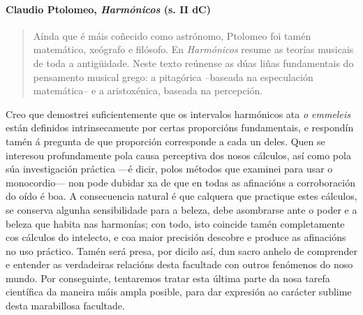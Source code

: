 

\paragraph{\texorpdfstring{Claudio Ptolomeo, \emph{Harmónicos} (s. II
dC)}{Claudio Ptolomeo, Harmónicos (s. II dC)}}\label{claudio-ptolomeo--harmuxf3nicos--s.-ii-dc}

\begin{quote}
Aínda que é máis coñecido como astrónomo, Ptolomeo foi tamén matemático, xeógrafo e filósofo. En \emph{Harmónicos} resume as teorías musicais de toda a antigüidade. Neste texto reúnense as dúas liñas fundamentais do pensamento musical grego: a pitagórica --baseada na especulación matemática-- e a aristoxénica, baseada na percepción.
\end{quote}

\begin{multicols}{3}
\setlength{\columnseprule}{1pt}
{\small
\noindent
Creo que demostrei suficientemente que os intervalos harmónicos ata \emph{o emmeleis} están definidos intrinsecamente por certas proporcións fundamentais, e respondín tamén á pregunta de que proporción corresponde a cada un deles. Quen se interesou profundamente pola causa perceptiva dos nosos cálculos, así como pola súa investigación práctica ---é dicir,
polos métodos que examinei para usar o monocordio--- non pode dubidar xa de que en todas as afinacións a corroboración do oído é boa. A consecuencia natural é que calquera que practique estes cálculos, se conserva algunha sensibilidade para a beleza, debe asombrarse ante o poder e a beleza que habita nas harmonías; con todo, isto coincide tamén completamente cos cálculos do intelecto, e coa maior precisión descobre e produce as afinacións no uso práctico. Tamén será presa, por dicilo así, dun sacro anhelo de comprender e entender as verdadeiras relacións desta facultade con outros fenómenos do noso mundo. Por conseguinte, tentaremos tratar esta última parte da nosa tarefa científica da maneira
máis ampla posible, para dar expresión ao carácter sublime desta marabillosa facultade.
}
\end{multicols}




